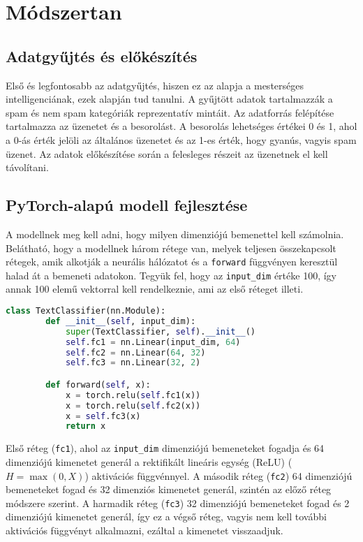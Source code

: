 ﻿\section{Módszertan}

\lstset{
  basicstyle=\small\ttfamily,
  captionpos=b,
  frame=single,
  breaklines=true,
  showstringspaces=false,
  aboveskip=2.5pt,
  belowskip=2pt
}

\subsection{Adatgyűjtés és előkészítés}
Első és legfontosabb az adatgyűjtés, hiszen ez az alapja a mesterséges intelligenciának, ezek alapján tud tanulni. A gyűjtött adatok tartalmazzák a spam és nem spam kategóriák reprezentatív mintáit. Az adatforrás felépítése tartalmazza az üzenetet és a besorolást. A besorolás lehetséges értékei 0 és 1, ahol a 0-ás érték jelöli az általános üzenetet és az 1-es érték, hogy gyanús, vagyis spam üzenet.
\indent Az adatok előkészítése során a felesleges részeit az üzenetnek el kell távolítani.

\subsection{PyTorch-alapú modell fejlesztése}
A modellnek meg kell adni, hogy milyen dimenziójú bemenettel kell számolnia. Belátható, hogy a modellnek három rétege van, melyek teljesen összekapcsolt rétegek, amik alkotják a neurális hálózatot és a \verb|forward| függvényen keresztül halad át a bemeneti adatokon. Tegyük fel, hogy az \verb|input_dim| értéke 100, így annak 100 elemű vektorral kell rendelkeznie, ami az első réteget illeti.
\begin{lstlisting}[language=Python, caption={Modell Python kód tartalma}, label=modell]
    class TextClassifier(nn.Module):
        def __init__(self, input_dim):
            super(TextClassifier, self).__init__()
            self.fc1 = nn.Linear(input_dim, 64)
            self.fc2 = nn.Linear(64, 32)
            self.fc3 = nn.Linear(32, 2)

        def forward(self, x):
            x = torch.relu(self.fc1(x))
            x = torch.relu(self.fc2(x))
            x = self.fc3(x)
            return x
\end{lstlisting}
\indent \indent Első réteg (\verb|fc1|), ahol az \verb|input_dim| dimenziójú bemeneteket fogadja és 64 dimenziójú kimenetet generál a rektifikált lineáris egység (ReLU) ($H = \mathop{\mathrm{max}}(0, X)$) aktivációs függvénnyel. A második réteg (\verb|fc2|) 64 dimenziójú bemeneteket fogad és 32 dimenziós kimenetet generál, szintén az előző réteg módszere szerint. A harmadik réteg (\verb|fc3|) 32 dimenziójú bemeneteket fogad és 2 dimenziójú kimenetet generál, így ez a végső réteg, vagyis nem kell további aktivációs függvényt alkalmazni, ezáltal a kimenetet visszaadjuk.

